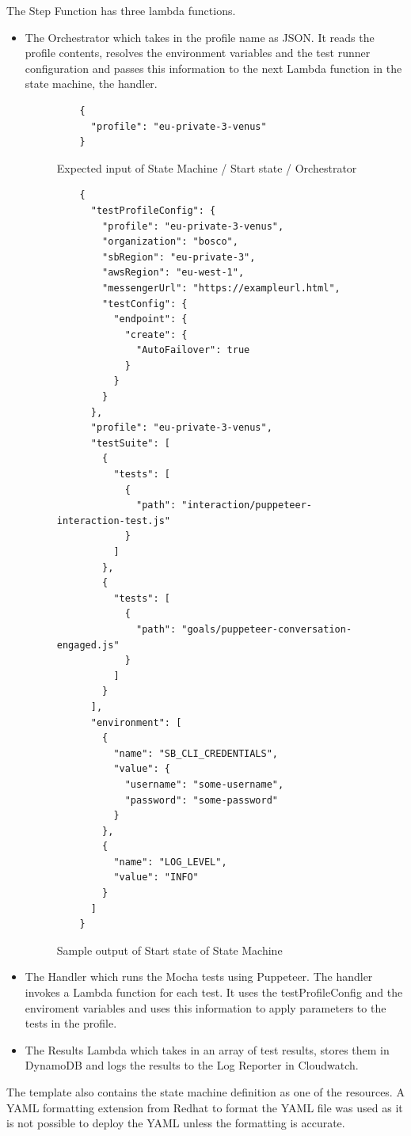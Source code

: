 \documentclass[12pt,a4paper,titlepage]{report}
\begin{document}
The Step Function has three lambda functions. 
\begin{itemize}
  \item The Orchestrator which takes in the profile name as JSON. It reads the profile contents, resolves the environment variables and the test runner configuration and passes this information to the next Lambda function in the state machine, the handler.  

\begin{figure}[H]
  \begin{tcolorbox}
   \begin{verbatim}
    {
      "profile": "eu-private-3-venus"
    }
   \end{verbatim}
  \end{tcolorbox}
  \caption{Expected input of State Machine / Start state / Orchestrator}
 \end{figure}

 \begin{figure}[H]
  \begin{tcolorbox}
   \begin{verbatim}
    {
      "testProfileConfig": {
        "profile": "eu-private-3-venus",
        "organization": "bosco",
        "sbRegion": "eu-private-3",
        "awsRegion": "eu-west-1",
        "messengerUrl": "https://exampleurl.html",
        "testConfig": {
          "endpoint": {
            "create": {
              "AutoFailover": true
            }
          }
        }
      },
      "profile": "eu-private-3-venus",
      "testSuite": [
        {
          "tests": [
            {
              "path": "interaction/puppeteer-interaction-test.js"
            }
          ]
        },
        {
          "tests": [
            {
              "path": "goals/puppeteer-conversation-engaged.js"
            }
          ]
        }
      ],
      "environment": [
        {
          "name": "SB_CLI_CREDENTIALS",
          "value": {
            "username": "some-username",
            "password": "some-password"
          }
        },
        {
          "name": "LOG_LEVEL",
          "value": "INFO"
        }
      ]
    }
 \end{verbatim}
  \end{tcolorbox}
  \caption{Sample output of Start state of State Machine}
 \end{figure}

 \item The Handler which runs the Mocha tests using Puppeteer. The handler invokes a Lambda function for each test. It uses the testProfileConfig and the 
 enviroment variables and uses this information to apply parameters to the tests in the profile. 
 \item The Results Lambda which takes in an array of test results, stores them in DynamoDB and logs the results to the Log Reporter in Cloudwatch.
\end{itemize}
 The
template also contains the state machine definition as one of the resources. A YAML formatting extension from Redhat to format the YAML
file was used as it is not possible to deploy the YAML unless the formatting is accurate.
\end{document}

